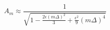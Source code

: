 \begin{equation}
 A_{m} \approx \frac{1}{ \sqrt{1- \frac{2 \epsilon (m \Delta)^2}{3}+ 
\frac{\epsilon^2}{9} (m \Delta)^4}}
\end{equation}

